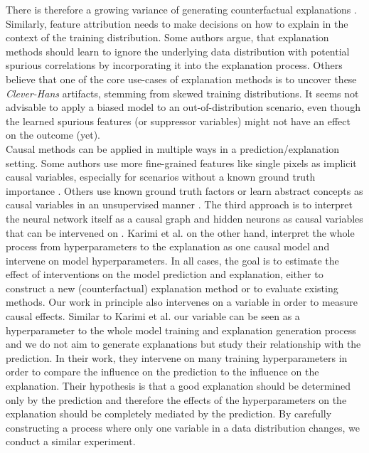 There is therefore a growing variance of generating counterfactual explanations \cite{Moraffah2020a}. Similarly, feature attribution needs to make decisions on how to explain in the context of the training distribution. 
Some authors \cite{Kindermans2017,Wilming2023, Wilming2022} argue, that explanation methods should learn to ignore the underlying data distribution with potential spurious correlations by incorporating it into the explanation process. Others believe that one of the core use-cases of explanation methods is to uncover these \textit{Clever-Hans} artifacts, stemming from skewed training distributions. It seems not advisable to apply a biased model to an out-of-distribution scenario, even though the learned spurious features (or suppressor variables) might not have an effect on the outcome (yet).\\

Causal methods can be applied in multiple ways in a prediction/explanation setting.
Some authors use more fine-grained features like single pixels as implicit causal variables, especially for scenarios without a known ground truth importance \cite{Zeiler2013,Fong2017,Samek2017a}. Others use known ground truth factors or learn abstract concepts as causal variables in an unsupervised manner \cite{Goyal2019, Tran2022, Reimers2019, Reimers2020, Harradon2018}. The third approach is to interpret the neural network itself as a causal graph and hidden neurons as causal variables that can be intervened on \cite{Narendra2018, Chattopadhyay2019}. Karimi et al. \cite{Karimi2023} on the other hand, interpret the whole process from hyperparameters to the explanation as one causal model and intervene on model hyperparameters. 
In all cases, the goal is to estimate the effect of interventions on the model prediction and explanation, either to construct a new (counterfactual) explanation method or to evaluate existing methods.
Our work in principle also intervenes on a variable in order to measure causal effects. Similar to Karimi et al. \cite{Karimi2023} our variable can be seen as a hyperparameter to the whole model training and explanation generation process and we do not aim to generate explanations but study their relationship with the prediction. In their work, they intervene on many training hyperparameters in order to compare the influence on the prediction to the influence on the explanation. Their hypothesis is that a good explanation should be determined only by the prediction and therefore the effects of the hyperparameters on the explanation should be completely mediated by the prediction. By carefully constructing a process where only one variable in a data distribution changes, we conduct a similar experiment. 


